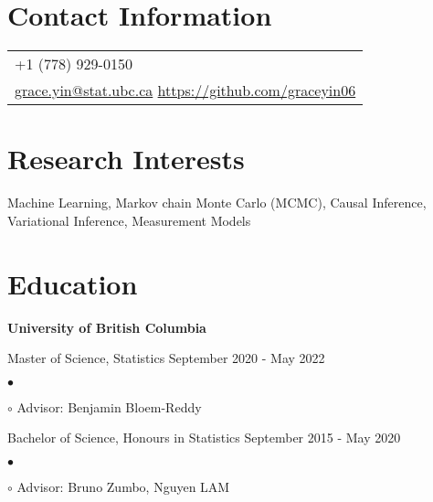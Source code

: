\documentclass[margin,line]{res}
\newenvironment{list1}{
  \begin{list}{\ding{113}}{%
      \setlength{\itemsep}{0in}
      \setlength{\parsep}{0in} \setlength{\parskip}{0in}
      \setlength{\topsep}{0in} \setlength{\partopsep}{0in}
      \setlength{\leftmargin}{0.17in}}}{\end{list}}
\newenvironment{list2}{
  \begin{list}{$\bullet$}{%
      \setlength{\itemsep}{0in}
      \setlength{\parsep}{0in} \setlength{\parskip}{0in}
      \setlength{\topsep}{0in} \setlength{\partopsep}{0in}
      \setlength{\leftmargin}{0.2in}}}{\end{list}}
\begin{document}

\begin{resume}

\section{\sc Contact Information}

\vspace{.05in}
\begin{tabular}{p{2in}}
+1 (778) 929-0150 \\
\href{mailto:grace.yin@stat.ubc.ca}{grace.yin@stat.ubc.ca}
\href{https://github.com/graceyin06}{https://github.com/graceyin06}
\end{tabular}


\section{\sc Research Interests}
Machine Learning, Markov chain Monte Carlo (MCMC), Causal Inference, Variational Inference,  Measurement Models

\section{\sc Education}
{\bf University of British Columbia}\\
\vspace*{-.1in}
\begin{list1}
\item[] Master of Science, Statistics \hfill{September 2020 - May 2022 }
 \begin{list2}
    \item[$\circ$] Advisor: Benjamin Bloem-Reddy
  \end{list2}
\item[] Bachelor of Science, Honours in Statistics \hfill{September 2015 - May 2020}
 \begin{list2}
    \item[$\circ$] Advisor: Bruno Zumbo, Nguyen LAM
  \end{list2}

\end{list1}


\end{resume}
\end{document}
